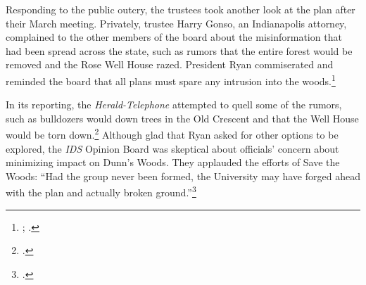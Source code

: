 \documentclass[
  american,
  letterpaper,
]{scrreprt}
\begin{document}
Responding to the public outcry, the trustees took another look at the
plan after their March meeting. Privately, trustee Harry Gonso, an
Indianapolis attorney, complained to the other members of the board
about the misinformation that had been spread across the state, such as
rumors that the entire forest would be removed and the Rose Well House
razed. President Ryan commiserated and reminded the board that all plans
must spare any intrusion into the woods.\footnote{;
  .}

In its reporting, the \emph{Herald-Telephone} attempted to quell some of
the rumors, such as bulldozers would down trees in the Old Crescent and
that the Well House would be torn down.\footnote{.} Although glad that Ryan
asked for other options to be explored, the \emph{IDS} Opinion Board was
skeptical about officials' concern about minimizing impact on Dunn's
Woods. They applauded the efforts of Save the Woods: ``Had the group
never been formed, the University may have forged ahead with the plan
and actually broken ground.''\footnote{.}
\end{document}

